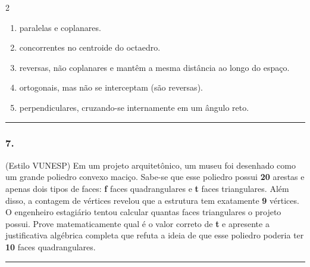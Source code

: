 \documentclass[twoside, 10pt, a4paper]{article}
\newlength{\espacoPreQuestao}\setlength{\espacoPreQuestao}{0.1cm}
\newlength{\espacoQuestao}\setlength{\espacoQuestao}{0.2cm}
\newlength{\espacoAlt}\setlength{\espacoAlt}{0.2cm}
\begin{document}
\begin{multicols*}{2}
\begin{enumerate}[label=\alph*), itemsep=\espacoAlt]
\item paralelas e coplanares.
\item concorrentes no centroide do octaedro.
\item reversas, não coplanares e mantêm a mesma distância ao longo do espaço.
\item ortogonais, mas não se interceptam (são reversas).
\item perpendiculares, cruzando-se internamente em um ângulo reto.
\end{enumerate}
\par\vspace{\espacoQuestao}

\noindent\textcolor{CorLinha}{\rule{\linewidth}{0.5pt}} 
\par\vspace{\espacoPreQuestao}
\subsubsection*{7.} (Estilo VUNESP) Em um projeto arquitetônico, um museu foi desenhado como um grande poliedro convexo maciço. Sabe-se que esse poliedro possui \textbf{20} arestas e apenas dois tipos de faces: \textbf{f} faces quadrangulares e \textbf{t} faces triangulares. Além disso, a contagem de vértices revelou que a estrutura tem exatamente \textbf{9} vértices. O engenheiro estagiário tentou calcular quantas faces triangulares o projeto possui. Prove matematicamente qual é o valor correto de \textbf{t} e apresente a justificativa algébrica completa que refuta a ideia de que esse poliedro poderia ter \textbf{10} faces quadrangulares.
\par\vspace{\espacoQuestao}

\noindent\textcolor{CorLinha}{\rule{\linewidth}{0.5pt}} 
\par\vspace{\espacoPreQuestao}

\end{multicols*}
\end{document}

